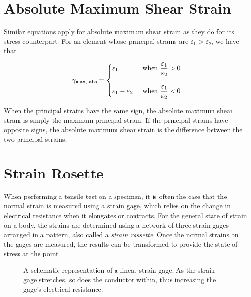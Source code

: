 \documentclass[
10pt,
a4paper,
openany,
svgnames,
]{book} %
\begin{document}
\section{Absolute Maximum Shear Strain}

Similar equations apply for absolute maximum shear strain as they do for its stress counterpart. For an element whose principal strains are $\varepsilon_1 > \varepsilon_2$, we have that

\begin{equation}
  \gamma_{\text{max, abs}} = \left\{
    \begin{gathered}
      \varepsilon_1 \hfill \text{when } \frac{\varepsilon_1}{\varepsilon_2} > 0 \\[10pt]
      \varepsilon_1 - \varepsilon_2 \hspace{0.5cm} \text{when } \frac{\varepsilon_1}{\varepsilon_2} < 0
    \end{gathered} \right.
\end{equation}

When the principal strains have the same sign, the absolute maximum shear strain is simply the maximum principal strain. If the principal strains have opposite signs, the absolute maximum shear strain is the difference between the two principal strains.

\section{Strain Rosette}

When performing a tensile test on a specimen, it is often the case that the normal strain is measured using a strain gage, which relies on the change in electrical resistance when it elongates or contracts. For the general state of strain on a body, the strains are determined using a network of three strain gages arranged in a pattern, also called a \emph{strain rossette}. Once the normal strains on the gages are measured, the results can be transformed to provide the state of stress at the point.

\begin{figure}[h]
  \centering
  \caption{A schematic representation of a linear strain gage. As the strain gage stretches, so does the conductor within, thus increasing the gage's electrical resistance.}
\end{figure}
\end{document}
